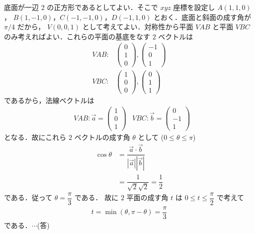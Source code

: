 \documentclass[../../main.tex]{subfiles}
\begin{document}
底面が一辺 $2$ の正方形であるとしてよい．そこで $xyz$ 座標を設定し $A(1,1,0)$，
$B(1,-1,0)$，$C(-1,-1,0)$，$D(-1,1,0)$ とおく．底面と斜面の成す角が $\pi/4$ だから，
$V(0,0,1)$ として考えてよい．対称性から平面 $VAB$ と平面 $VBC$ のみ考えればよい．これらの平面の基底をなす $2$ ベクトルは
\begin{align}
  VAB:&
  \begin{pmatrix}0\\1\\0
  \end{pmatrix} ,
  \begin{pmatrix}-1\\0\\1
  \end{pmatrix}  \\
  VBC:&
  \begin{pmatrix}1\\0\\0
  \end{pmatrix} ,
  \begin{pmatrix}0\\1\\1
  \end{pmatrix}
\end{align}
であるから，法線ベクトルは
\begin{align}
  &VAB:\vec{a}=
  \begin{pmatrix}1\\0\\1
  \end{pmatrix} &VBC:\vec{b}=
  \begin{pmatrix}0\\-1\\1
  \end{pmatrix}
\end{align}
となる．故にこれら $2$ ベクトルの成す角 $\theta$ として ($0\le\theta\le\pi$)
\begin{align}
  \cos\theta&=\dfrac{\vec{a}\cdot\vec{b}}{|\vec{a}||\vec{b}|} \\
  &=\dfrac{1}{\sqrt{2}\sqrt{2}}=\dfrac{1}{2}
\end{align}
である．従って $\theta=\dfrac{\pi}{3}$ である．
故に $2$ 平面の成す角 $t$ は $0\le t\le\dfrac{\pi}{2}$ で考えて
\begin{align}
  t=\min(\theta,\pi-\theta)=\dfrac{\pi}{3}
\end{align}
である．$\cdots$(答)
\end{document}
